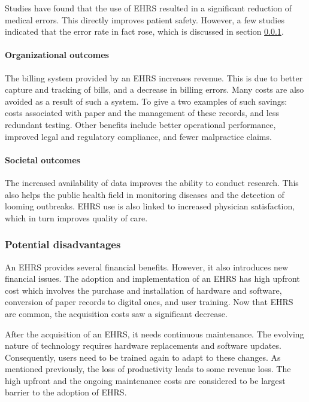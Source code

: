         Studies have found that the use of EHRS resulted in a significant reduction of medical errors. This directly improves patient safety. However, a few studies indicated that the error rate in fact rose, which is discussed in section \ref{ehrs_disadvantages}. %

        \paragraph{Organizational outcomes} The billing system provided by an EHRS increases revenue. This is due to better capture and tracking of bills, and a decrease in billing errors. Many costs are also avoided as a result of such a system. To give a two examples of such savings: costs associated with paper and the management of these records, and less redundant testing. Other benefits include better operational performance, improved legal and regulatory compliance, and fewer malpractice claims.

        \paragraph{Societal outcomes} The increased availability of data improves the ability to conduct research. This also helps the public health field in monitoring diseases and the detection of looming outbreaks. EHRS use is also linked to increased physician satisfaction\cite{Menachemi2009}, which in turn improves quality of care.

        \subsubsection{Potential disadvantages}\label{ehrs_disadvantages}

        An EHRS provides several financial benefits. However, it also introduces new financial issues. The adoption and implementation of an EHRS has high upfront cost which involves the purchase and installation of hardware and software, conversion of paper records to digital ones, and user training. Now that EHRS are common, the acquisition costs saw a significant decrease.

        After the acquisition of an EHRS, it needs continuous maintenance. The evolving nature of technology requires hardware replacements and software updates. Consequently, users need to be trained again to adapt to these changes. As mentioned previously, the loss of productivity leads to some revenue loss. The high upfront and the ongoing maintenance costs are considered to be largest barrier to the adoption of EHRS\cite{Menachemi2006}.

